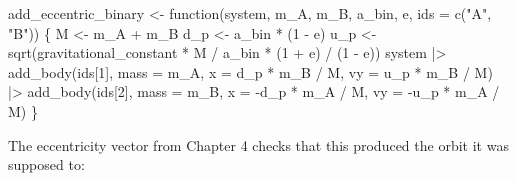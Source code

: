 \documentclass[
  10.5pt,
  letterpaper,
]{scrbook}
\newenvironment{Shaded}{\begin{snugshade}}{\end{snugshade}}
\newcommand{\AttributeTok}[1]{\textcolor[rgb]{0.00,0.00,0.00}{#1}}
\newcommand{\ControlFlowTok}[1]{\textcolor[rgb]{0.00,0.00,0.00}{#1}}
\newcommand{\DecValTok}[1]{\textcolor[rgb]{0.00,0.00,0.00}{#1}}
\newcommand{\FunctionTok}[1]{\textcolor[rgb]{0.00,0.00,0.00}{#1}}
\newcommand{\NormalTok}[1]{\textcolor[rgb]{0.00,0.00,0.00}{#1}}
\newcommand{\OtherTok}[1]{\textcolor[rgb]{0.00,0.00,0.00}{#1}}
\newcommand{\SpecialCharTok}[1]{\textcolor[rgb]{0.00,0.00,0.00}{#1}}
\newcommand{\StringTok}[1]{\textcolor[rgb]{0.00,0.00,0.00}{#1}}
\theoremstyle{plain}
\theoremstyle{remark}
\begin{document}
\begin{Shaded}
\begin{Highlighting}[]
\NormalTok{add\_eccentric\_binary }\OtherTok{\textless{}{-}} \ControlFlowTok{function}\NormalTok{(system, m\_A, m\_B, a\_bin, e, }\AttributeTok{ids =} \FunctionTok{c}\NormalTok{(}\StringTok{"A"}\NormalTok{, }\StringTok{"B"}\NormalTok{)) \{}
\NormalTok{  M   }\OtherTok{\textless{}{-}}\NormalTok{ m\_A }\SpecialCharTok{+}\NormalTok{ m\_B}
\NormalTok{  d\_p }\OtherTok{\textless{}{-}}\NormalTok{ a\_bin }\SpecialCharTok{*}\NormalTok{ (}\DecValTok{1} \SpecialCharTok{{-}}\NormalTok{ e)}
\NormalTok{  u\_p }\OtherTok{\textless{}{-}} \FunctionTok{sqrt}\NormalTok{(gravitational\_constant }\SpecialCharTok{*}\NormalTok{ M }\SpecialCharTok{/}\NormalTok{ a\_bin }\SpecialCharTok{*}\NormalTok{ (}\DecValTok{1} \SpecialCharTok{+}\NormalTok{ e) }\SpecialCharTok{/}\NormalTok{ (}\DecValTok{1} \SpecialCharTok{{-}}\NormalTok{ e))}
\NormalTok{  system }\SpecialCharTok{|\textgreater{}}
    \FunctionTok{add\_body}\NormalTok{(ids[}\DecValTok{1}\NormalTok{], }\AttributeTok{mass =}\NormalTok{ m\_A, }\AttributeTok{x =}\NormalTok{  d\_p }\SpecialCharTok{*}\NormalTok{ m\_B }\SpecialCharTok{/}\NormalTok{ M, }\AttributeTok{vy =}\NormalTok{  u\_p }\SpecialCharTok{*}\NormalTok{ m\_B }\SpecialCharTok{/}\NormalTok{ M) }\SpecialCharTok{|\textgreater{}}
    \FunctionTok{add\_body}\NormalTok{(ids[}\DecValTok{2}\NormalTok{], }\AttributeTok{mass =}\NormalTok{ m\_B, }\AttributeTok{x =} \SpecialCharTok{{-}}\NormalTok{d\_p }\SpecialCharTok{*}\NormalTok{ m\_A }\SpecialCharTok{/}\NormalTok{ M, }\AttributeTok{vy =} \SpecialCharTok{{-}}\NormalTok{u\_p }\SpecialCharTok{*}\NormalTok{ m\_A }\SpecialCharTok{/}\NormalTok{ M)}
\NormalTok{\}}
\end{Highlighting}
\end{Shaded}

The eccentricity vector from Chapter 4 checks that this produced the
orbit it was supposed to:
\end{document}
